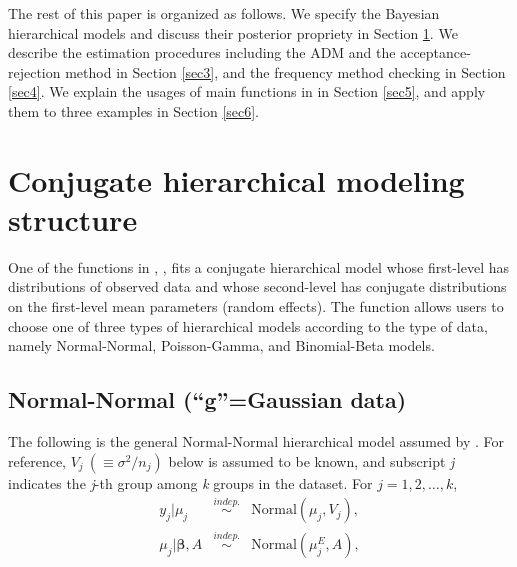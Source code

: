 \documentclass[article]{jss}
\begin{document}
The rest of this paper is organized as follows. We specify the Bayesian hierarchical models and discuss their posterior propriety in Section \ref{sec2}. We describe the estimation procedures including the ADM and the acceptance-rejection method in Section  \ref{sec3}, and the frequency method checking in Section \ref{sec4}.  We explain the usages of main functions in  in Section \ref{sec5}, and apply them to three examples in Section \ref{sec6}.



\section[Hierarchical Structure]{Conjugate hierarchical modeling structure} \label{sec2}

One of the functions in , , fits a conjugate hierarchical model whose first-level has distributions of observed data and whose second-level has conjugate distributions on the first-level mean parameters (random effects). The  function allows users to choose one of three types of hierarchical models according to the type of data, namely Normal-Normal, Poisson-Gamma, and Binomial-Beta models. 
 
\subsection[Normal-Normal]{Normal-Normal (``g''=Gaussian data)}
The following is the general Normal-Normal hierarchical model assumed by . For reference,  $V_{j}~(\equiv \sigma^{2}/n_{j})$ below is assumed to be known, and subscript \emph{j} indicates the \emph{j}-th group among \emph{k} groups in the dataset. For $j=1, 2, \ldots, k$, 
\begin{eqnarray}
y_{j}\vert \mu_{j} & \stackrel{indep.}{\sim} &\textrm{Normal}(\mu_{j}, V_{j}),\label{normalobs}\\
\mu_{j}\vert \boldsymbol{\beta}, A & \stackrel{indep.}{\sim} &\textrm{Normal}(\mu^E_{j}, A),\label{normalprior}
\end{eqnarray}
\end{document}
